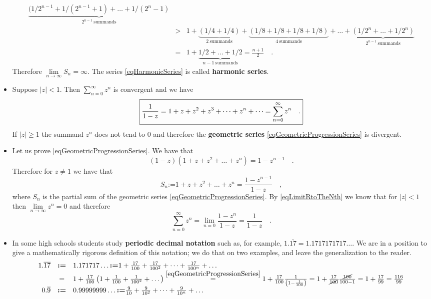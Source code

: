 \documentclass[12pt]{book}
\newcommand{\eqdef}{\textbf{:=}}
\newcommand{\importantFormula}[1]{\begin{equation} \boxed{#1} \end{equation}}
\renewcommand{\emph}{\textbf}
\begin{document}
\begin{itemize}
\begin{equation*}
\begin{array}{rcl}
\underbrace{(1/2^{n-1}+1/(2^{n-1}+1)+\dots +1/(2^{n}-1)}_{2^{n-1}\mathrm{~summands}}\\
&>& 1+ \underbrace{\left(1/4+1/4\right)}_{\mathrm{2~summands}} +\underbrace{(1/8+1/8+1/8+1/8)}_{\mathrm{4~summands}}+\dots +
\underbrace{(1/2^{n}+\dots +1/2^{n})}_{2^{n-1}\mathrm{~summands}}\\
&=&1+\underbrace{  1/2+\dots +1/2}_{n-1\mathrm{~summands}}= \frac{n+1}2\quad . 
\end{array}
\end{equation*}
Therefore $\lim\limits_{n\to \infty} S_{n}=\infty $. The series \eqref{eqHarmonicSeries} is called \emph{harmonic series}.
\item Suppose $|z|<1$. Then $\sum_{n=0}^{\infty} z^n$ is convergent and we have
\importantFormula{
\label{eqGeometricProgressionSeries}
\frac{1}{1-z}=1+z+z^2+z^3+\dots +z^n+\dots= \sum_{n=0}^{\infty} z^n\quad.
}
If $|z|\geq 1$ the summand $z^n$ does not tend to $0$ and therefore the \emph{geometric series} \eqref{eqGeometricProgressionSeries} is divergent. 
\item Let us prove \eqref{eqGeometricProgressionSeries}. We have that 
\[(1-z)(1+z+z^2+\dots +z^{n})= 1- z^{n-1}\quad .
\]
Therefore for $z\neq 1$ we have that 
\[
S_n\eqdef 1+z+z^2+\dots +z^n=\frac{1-z^{n-1}}{1-z}\quad ,
\]
where $S_n$ is the partial sum of the geometric series \eqref{eqGeometricProgressionSeries}. By \eqref{eqLimitRtoTheNth} we know that for $|z|<1$ then $\lim\limits_{n\to \infty} z^n=0$ and therefore 
\[
\sum_{n=0}^{\infty}z^n=\lim\limits_{n=0} \frac{1-z^n}{1-z}= \frac{1}{1-z} \quad.
\]
\item In some high schools students study \emph{periodic decimal notation} such as, for example, $1.\overline{17}= 1.1717171717\dots$. We are in a position to give a mathematically rigorous definition of this notation; we do that on two examples, and leave the generalization to the reader.
\[
\begin{array}{rcl}
1.\overline{17}&\eqdef&  1.171717\dots\eqdef 1+ \frac{17}{100}+ \frac{17}{100^2}+\dots +\frac{17}{100^n}+\dots\\
&=&1+\frac{17}{100}\left(1+\frac{1}{100}+\frac{1}{100^2}+\dots \right)\stackrel{\eqref{eqGeometricProgressionSeries}}{=} 1+\frac{17}{100}\frac{1}{\left(1-\frac{1}{100}\right)}=1+\frac{17}{\cancel{100}}\frac{\cancel{100}}{100-1}= 1+\frac{17}{99}= \frac{116}{99}\\
0.\overline{9}&\eqdef&  0.99999999\dots \eqdef \frac{9}{10}+ \frac{9}{10^2}+\dots +\frac{9}{10^n}+\dots\\

\end{array}\]
\end{itemize}
\end{document}
